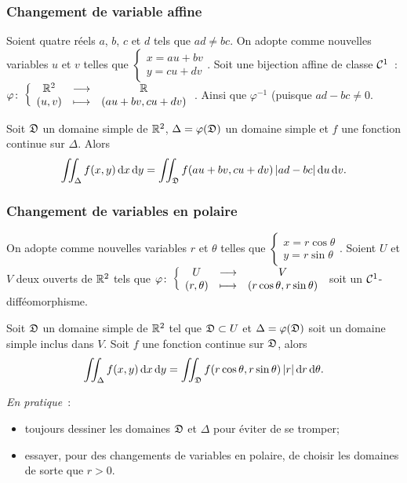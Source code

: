 \subsubsection{Changement de variable affine}

\begin{theo}
  Soient quatre réels \(a\), \(b\), \(c\) et \(d\) tels que \(ad \neq bc\). On adopte comme nouvelles variables \(u\) et \(v\) telles que \(\begin{cases} x=au+bv \\ y=cu+dv \end{cases}\). Soit une bijection affine de classe \(\mathcal{C}^{1}\)~: \(\varphi\colon \left\{\begin{array}{ccc} \mathbb{R}^2 & \longrightarrow &\mathbb{R}\\ (u,v) & \longmapsto & (au+bv, cu+dv) \end{array} \right.\). Ainsi que \(\varphi^{-1}\) (puisque \(ad-bc\neq 0\).

  Soit \(\mathfrak{D}\) un domaine simple de \(\mathbb{R}^2\), \(\Delta=\varphi(\mathfrak{D})\) un domaine simple et \(f\) une fonction continue sur \(\Delta\). Alors
  \begin{equation}
    \iint_\Delta f(x,y)\mathop{}\mathopen{}\mathrm{d} x \mathop{}\mathopen{}\mathrm{d} y = \iint_{\mathfrak{D}} f(au+bv, cu+dv) \left\lvert ad-bc\right\rvert\mathop{}\mathopen{}\mathrm{d} u \mathop{}\mathopen{}\mathrm{d} v.
  \end{equation}
\end{theo}

\subsubsection{Changement de variables en polaire}

\begin{theo}
  On adopte comme nouvelles variables \(r\) et \(\theta\) telles que \(\begin{cases} x=r\cos\theta \\ y=r\sin\theta \end{cases}\). Soient \(U\) et \(V\) deux ouverts de \(\mathbb{R}^2\) tels que \(\varphi\colon \left\{\begin{array}{ccc} U & \longrightarrow &V\\ (r, \theta) & \longmapsto & (r\cos\theta, r\sin\theta) \end{array} \right.\) soit un \(\mathcal{C}^{1}\)-difféomorphisme.

  Soit \(\mathfrak{D}\) un domaine simple de \(\mathbb{R}^2\) tel que \(\mathfrak{D} \subset U\) et \(\Delta=\varphi(\mathfrak{D})\) soit un domaine simple inclus dans \(V\). Soit \(f\) une fonction continue sur \(\mathfrak{D}\), alors
  \begin{equation}
    \iint_\Delta f(x,y)\mathop{}\mathopen{}\mathrm{d} x \mathop{}\mathopen{}\mathrm{d} y = \iint_{\mathfrak{D}} f(r\cos\theta, r\sin\theta) \left\lvert r\right\rvert\mathop{}\mathopen{}\mathrm{d} r \mathop{}\mathopen{}\mathrm{d} \theta.
  \end{equation}
\end{theo}

\emph{En pratique}~:
\begin{itemize}
  \item toujours dessiner les domaines \(\mathfrak{D}\) et \(\Delta\) pour éviter de se tromper;
  \item essayer, pour des changements de variables en polaire, de choisir les domaines de sorte que \(r>0\).
\end{itemize}

